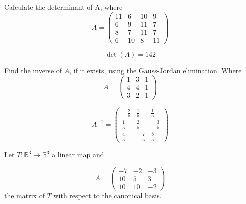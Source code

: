 \begin{questions}

\question Calculate the determinant of A, where
$$
A=\left(\begin{array}{rrrr}
11 & 6 & 10 & 9 \\
6 & 9 & 11 & 7 \\
8 & 7 & 11 & 7 \\
6 & 10 & 8 & 11
\end{array}\right)
$$

\begin{solution}
$$\det(A)=142$$
\end{solution}

\question Find the inverse of $A$, if it exists, using the Gauss-Jordan elimination. Where
$$
A=\left(\begin{array}{rrr}
1 & 3 & 1 \\
4 & 4 & 1 \\
3 & 2 & 1
\end{array}\right)
$$

\begin{solution}
$$A^{-1}=\left(\begin{array}{rrr}
-\frac{2}{5} & \frac{1}{5} & \frac{1}{5} \\
\frac{1}{5} & \frac{2}{5} & -\frac{3}{5} \\
\frac{4}{5} & -\frac{7}{5} & \frac{8}{5}
\end{array}\right)$$
\end{solution}

\question Let $T:\mathbb{R}^3\rightarrow\mathbb{R}^3$  a linear map and
 
$$
A=\left(\begin{array}{rrr}
-7 & -2 & -3 \\
10 & 5 & 3 \\
10 & 10 & -2
\end{array}\right)
$$
the matrix of $T$ with respect to the canonical basis.
\end{questions}
